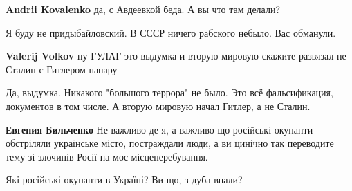 \begin{itemize}
\begin{itemize}
\textbf{Andrii Kovalenko} да, с Авдеевкой беда. А вы что там делали?

 
Я буду не придыбайловский.
В СССР ничего рабского небыло.
Вас обманули.

 
\textbf{Valerij Volkov} ну ГУЛАГ это выдумка и вторую мировую скажите развязал не Сталин с Гитлером напару

 
Да, выдумка.
Никакого "большого террора" не было.
Это всё фальсификация, документов в том числе.
А вторую мировую начал Гитлер, а не Сталин.

 
\textbf{Евгения Бильченко} Не важливо де я, а важливо що російські окупанти
обстріляли українське місто, постраждали люди, а ви цинічно так переводите тему
зі злочинів Росії на моє місцеперебування.

 
Які російські окупанти в Україні? Ви що, з дуба впали?

 

\end{itemize}
\end{itemize}
